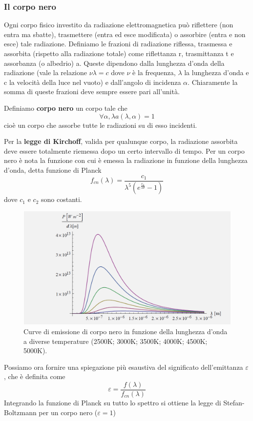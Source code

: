 \documentclass[
10pt, %
a4paper, %
oneside, %
headinclude,footinclude, %
BCOR5mm, %
]{scrartcl}
\begin{document}
\subsubsection{Il corpo nero} 
Ogni corpo fisico investito da radiazione elettromagnetica può riflettere (non entra ma sbatte), trasmettere (entra ed esce modificata) o assorbire (entra e non esce) tale radiazione. Definiamo le frazioni di radiazione riflessa, trasmessa e assorbita (rispetto alla radiazione totale) come riflettanza r, trasmittanza t e assorbanza (o albedrio) a. Queste dipendono dalla lunghezza d'onda della radiazione (vale la relazione \(\nu \lambda = c\) dove $\nu$ è la frequenza, $\lambda$ la lunghezza d'onda e c la velocità della luce nel vuoto) e dall'angolo di incidenza $\alpha$. Chiaramente la somma di queste frazioni deve sempre essere pari all'unità. 
\begin{definition}
	Definiamo \textbf{corpo nero} un corpo tale che
	\[\forall \alpha, \lambda a(\lambda, \alpha) = 1\]
	cioè un corpo che assorbe tutte le radiazioni su di esso incidenti. 
\end{definition}
Per la \textbf{legge di Kirchoff}, valida per qualunque corpo, la radiazione assorbita deve essere totalmente riemessa dopo un certo intervallo di tempo. Per un corpo nero è nota la funzione con cui è emessa la radiazione in funzione della lunghezza d'onda, detta funzione di Planck
\[f_{cn}(\lambda) = \frac{c_1}{\lambda^5 (e^{\frac{c_2}{\lambda\theta}}-1)}\]
dove $c_1$ e $c_2$ sono costanti.
\begin{figure}[h!]
	\centering
	\includegraphics[width=0.7\linewidth]{../images/corpo_nero}
	\caption{Curve di emissione di corpo nero in funzione della lunghezza d’onda a
		diverse temperature (2500K; 3000K; 3500K; 4000K; 4500K; 5000K).}
	\label{fig:corpo_nero}
\end{figure}
\FloatBarrier
Possiamo ora fornire una spiegazione più esaustiva del significato dell'emittanza $\varepsilon$, che è definita come
\[\varepsilon= \frac{f(\lambda)}{f_{cn}(\lambda)}\]
Integrando la funzione di Planck su tutto lo spettro si ottiene la legge di Stefan-Boltzmann per un corpo nero ($\varepsilon = 1$)
\end{document}
